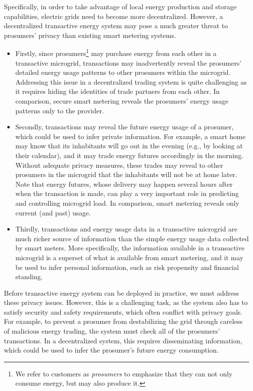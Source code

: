 Specifically, 
in order to take advantage of local energy production and storage capabilities, 
electric grids need to become more decentralized.
However, a decentralized transactive energy system may pose a much greater threat to prosumers' privacy than existing smart metering systems.
\begin{itemize}
\item Firstly, since prosumers\footnote{We refer to customers as \emph{prosumers} to emphasize that they can not only consume energy, but may also produce it.}  may purchase energy from each other in a transactive microgrid, transactions may inadvertently reveal the prosumers' detailed energy usage patterns to other prosumers within the microgrid.
Addressing this issue in a decentralized trading system is quite challenging as it requires hiding the identities of trade partners from each other.
In comparison, secure smart metering reveals the prosumers' energy usage patterns only to the provider. 
\item Secondly, transactions may reveal the future energy usage of a prosumer, which could be used to infer private information.
For example, a smart home may know that its inhabitants will go out in the evening (e.g., by looking at their calendar), and it may trade energy futures accordingly in the morning.
Without adequate privacy measures, these trades may reveal to other prosumers in the microgrid that the inhabitants will not be at home later.
Note that energy futures, whose delivery may happen several hours after when the transaction is made, can play a very important role in predicting and controlling microgrid load.
In comparison, smart metering reveals only current (and past) usage.
\item Thirdly, transactions and energy usage data in a transactive microgrid are much richer source of information than the simple energy usage data collected by smart meters.
More specifically, the information available in a transactive microgrid is a superset of what is available from smart metering, and it may be used to infer personal information, such as risk propensity and financial standing.
\end{itemize}

Before transactive energy system can be deployed in practice, we must address these privacy issues.
However, this is a challenging task, as the system also has to satisfy security and safety requirements, which often conflict with privacy goals.
For example, to prevent a prosumer from destabilizing the grid through careless of malicious energy trading, the system must check all of the prosumers' transactions.
In a decentralized system, this requires disseminating information, which could be used to infer the prosumer's future energy consumption.

